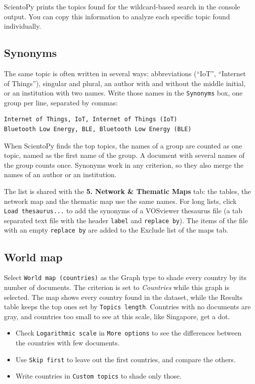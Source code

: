 \documentclass[10pt,letterpaper]{article}
\begin{document}
ScientoPy prints the topics found for the wildcard-based search in the console output. You can copy this information to analyze each specific topic found individually.

\subsection{Synonyms}
\label{sec_synonyms}

The same topic is often written in several ways: abbreviations (``IoT'', ``Internet of Things''), singular and plural, an author with and without the middle initial, or an institution with two names. Write those names in the \verb|Synonyms| box, one group per line, separated by commas:
\begin{verbatim}
Internet of Things, IoT, Internet of Things (IoT)
Bluetooth Low Energy, BLE, Bluetooth Low Energy (BLE)
\end{verbatim}

When ScientoPy finds the top topics, the names of a group are counted as one topic, named as the first name of the group. A document with several names of the group counts once. Synonyms work in any criterion, so they also merge the names of an author or an institution.

The list is shared with the \textbf{5. Network \& Thematic Maps} tab: the tables, the network map and the thematic map use the same names. For long lists, click \verb|Load thesaurus...| to add the synonyms of a VOSviewer thesaurus file (a tab separated text file with the header \verb|label| and \verb|replace by|). The items of the file with an empty \verb|replace by| are added to the Exclude list of the maps tab.

\subsection{World map}
\label{sec_world_map}

Select \verb|World map (countries)| as the Graph type to shade every country by its number of documents. The criterion is set to \emph{Countries} while this graph is selected. The map shows every country found in the dataset, while the Results table keeps the top ones set by \verb|Topics length|. Countries with no documents are gray, and countries too small to see at this scale, like Singapore, get a dot.

\begin{itemize}
\item Check \verb|Logarithmic scale| in \verb|More options| to see the differences between the countries with few documents.
\item Use \verb|Skip first| to leave out the first countries, and compare the others.
\item Write countries in \verb|Custom topics| to shade only those.
\end{itemize}
\end{document}
